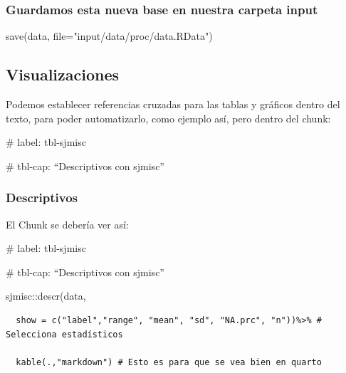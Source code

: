 \documentclass[
  letterpaper,
  DIV=11,
  numbers=noendperiod]{scrartcl}
\newenvironment{Shaded}{\begin{snugshade}}{\end{snugshade}}
\newcommand{\AttributeTok}[1]{\textcolor[rgb]{0.40,0.45,0.13}{#1}}
\newcommand{\ConstantTok}[1]{\textcolor[rgb]{0.56,0.35,0.01}{#1}}
\newcommand{\DecValTok}[1]{\textcolor[rgb]{0.68,0.00,0.00}{#1}}
\newcommand{\FunctionTok}[1]{\textcolor[rgb]{0.28,0.35,0.67}{#1}}
\newcommand{\NormalTok}[1]{\textcolor[rgb]{0.00,0.23,0.31}{#1}}
\newcommand{\OtherTok}[1]{\textcolor[rgb]{0.00,0.23,0.31}{#1}}
\newcommand{\SpecialCharTok}[1]{\textcolor[rgb]{0.37,0.37,0.37}{#1}}
\newcommand{\StringTok}[1]{\textcolor[rgb]{0.13,0.47,0.30}{#1}}
\begin{document}
\begin{Shaded}
\end{Shaded}

\subsubsection{Guardamos esta nueva base en nuestra carpeta
input}\label{guardamos-esta-nueva-base-en-nuestra-carpeta-input}

\begin{Shaded}
\begin{Highlighting}[]
\FunctionTok{save}\NormalTok{(data, }\AttributeTok{file=}\StringTok{"input/data/proc/data.RData"}\NormalTok{)}
\end{Highlighting}
\end{Shaded}

\subsection{Visualizaciones}\label{visualizaciones}

Podemos establecer referencias cruzadas para las tablas y gráficos
dentro del texto, para poder automatizarlo, como ejemplo así, pero
dentro del chunk:

\#\textbar{} label: tbl-sjmisc

\#\textbar{} tbl-cap: ``Descriptivos con sjmisc''

\subsubsection{Descriptivos}\label{descriptivos}

El Chunk se debería ver así:

\#\textbar{} label: tbl-sjmisc

\#\textbar{} tbl-cap: ``Descriptivos con sjmisc''

sjmisc::descr(data,

\begin{verbatim}
  show = c("label","range", "mean", "sd", "NA.prc", "n"))%>% # Selecciona estadísticos

  kable(.,"markdown") # Esto es para que se vea bien en quarto
\end{verbatim}
\end{document}

